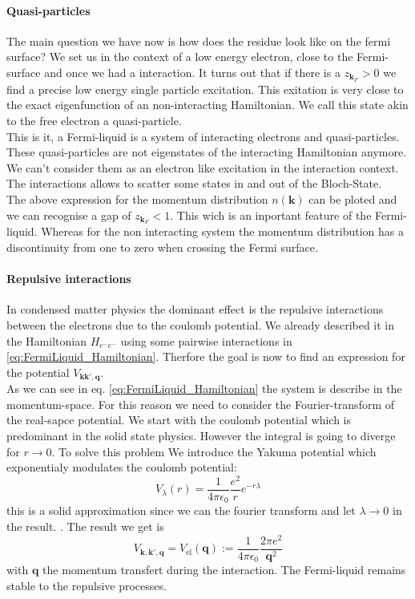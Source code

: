 \documentclass[../main.tex]{subfile}
\begin{document}
\paragraph{Quasi-particles}
The main question we have now is how does the residue look like on the fermi surface? We set us in the context of a low energy electron, close to the Fermi-surface and 
once we had a interaction. It turns out that if there is a $z_{\bm{k}_F}>0$ we find a precise low energy single particle excitation. This exitation is very close
to the exact eigenfunction of an non-interacting Hamiltonian. We call this state akin to the free electron a quasi-particle.\\

This is it, a Fermi-liquid is a system of interacting electrons and quasi-particles. These quasi-particles are not eigenstates of the interacting Hamiltonian anymore.
We can't consider them as an electron like excitation in the interaction context.
The interactions allows to scatter some states in and out of the Bloch-State.\\

The above expression for the momentum distribution $n(\bm{k})$ can be ploted and we can recognise a gap of $z_{\bm{k}_F}<1$. This wich is an inportant feature of
the Fermi-liquid. Whereas for the non interacting
system the momentum distribution has a discontinuity from one to zero when crossing the Fermi surface.


\paragraph{Repulsive interactions}
In condensed matter physics the dominant effect is the repulsive interactions between the electrons due to the coulomb potential. We already described it in the Hamiltonian 
$H_{e^-e^-}$ using some pairwise interactions in \ref{eq:FermiLiquid_Hamiltonian}. Therfore the goal is now to find an expression for the potential $V_{\bm{k}\bm{k}',\bm{q}}$.\\

As we can see in eq. \ref{eq:FermiLiquid_Hamiltonian} the system is describe in the momentum-space. For this reason we need to 
consider the Fourier-transform of the real-sapce potential. We start with the coulomb potential which is predominant in the solid state physics.
However the integral is going to diverge for $r\rightarrow 0$. To solve this problem We
introduce the Yakuma potential which exponentialy modulates the coulomb potential:
\begin{equation}
    V_{\lambda}(r) = \frac{1}{4\pi\epsilon_0} \frac{e^2}{r} e^{-r\lambda} \label{eq:Yakuma}
\end{equation}
this is a solid approximation since we can the fourier transform and let $\lambda\rightarrow 0$ in the result. .
The result we get is 
\begin{equation} \label{eq:Pot_repulsive_el}
    V_{\bm{k},\bm{k}',\bm{q}} = V_{\text{el}}(\bm{q}) := \frac{1}{4\pi\epsilon_0} \frac{2\pi e^2}{\bm{q}^2}
\end{equation}
with $\bm{q}$ the momentum transfert during the interaction. The Fermi-liquid remains stable to the repulsive processes.\\
\end{document}
